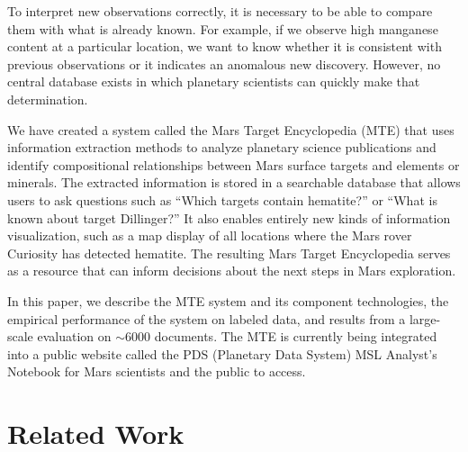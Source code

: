 \documentclass[letterpaper]{article} %
\begin{document}
To interpret new observations correctly, it is necessary to be able to
compare them with what is already known.  For example, if we observe
high manganese content at a particular location, we want to know
whether it is consistent with previous observations or it indicates an
anomalous new discovery.  However, no central database exists in which
planetary scientists can quickly make that determination.

We have created a system called the Mars Target Encyclopedia (MTE)
that uses information extraction methods to analyze planetary science
publications and identify compositional relationships between Mars
surface targets and elements or minerals.  The extracted information
is stored in a searchable database that allows users to ask questions
such as ``Which targets contain hematite?'' or ``What is known about
target Dillinger?''  It also enables entirely new kinds of information
visualization, such as a map display of all locations where the Mars
rover Curiosity has detected hematite.  The resulting Mars Target
Encyclopedia serves as a resource that can inform
decisions about the next steps in Mars exploration.  


In this paper, we describe the MTE system and its component
technologies, the empirical performance of the system on labeled data,
and results from a large-scale evaluation on $\sim$6000 documents.
The MTE is currently being integrated into a public website called the
PDS (Planetary Data System) MSL Analyst's Notebook for Mars scientists
and the public to access.


\section{Related Work}
\end{document}
